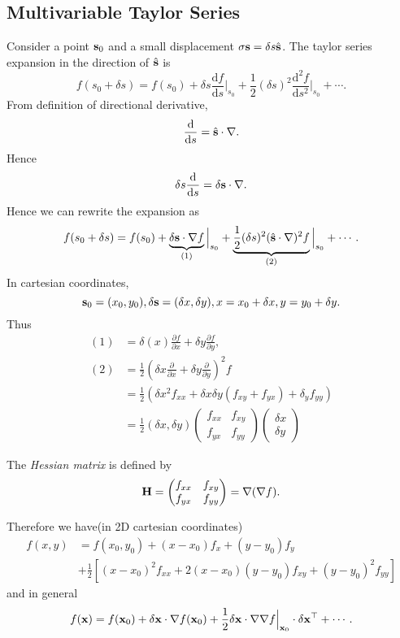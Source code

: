\documentclass[10pt]{article}
\begin{document}
    \subsection{Multivariable Taylor Series}
    Consider a point ${\bf s}_0$ and a small displacement $ \sigma{\bf s} = \delta s \hat{{\bf s}} $. The taylor series expansion in the direction of $\hat{{\bf s}}$ is 
    \[
        f(s_0+\delta s)=f(s_0)+\delta s \frac{\mathrm{d}f}{\mathrm{d}s}\Big|_{s_0}+\frac{1}{2}(\delta s)^2 \frac{\mathrm{d}^2f}{\mathrm{d}s^2}\Big|_{s_0}+\cdots  . 
    \]
    From definition of directional derivative, 
    \[
        \frac{\mathrm{d}}{\mathrm{d}s} = \hat{{\bf s}}\cdot \nabla. 
    \]
    Hence 
    \[
        \delta s \frac{\mathrm{d}}{\mathrm{d}s}=\delta{\bf s} \cdot \nabla . 
    \]
    Hence we can rewrite the expansion as 
    \[
        f(s_0+\delta s)=f(s_0)+\underbrace{\delta{\bf s} \cdot \nabla f}_{(1)}\Big|_{s_0}+\underbrace{\frac{1}{2}(\delta s)^2(\hat{{\bf s}}\cdot \nabla )^2 f}_{(2)}\Big|_{s_0}+\cdots .
    \]
    In cartesian coordinates,
    \[
        {\bf s}_0=(x_0,y_0), \delta{\bf s} = (\delta x,\delta y), x=x_0+\delta x, y=y_0+\delta y.
    \]
    Thus 
    \begin{align*}
        (1)&=\delta(x)\frac{\partial f}{\partial x}+\delta y \frac{\partial f}{\partial y}, \\
        (2)&= \frac{1}{2}\left( \delta x \frac{\partial }{\partial x}+\delta y \frac{\partial }{\partial y}   \right)^2 f\\
        &= \frac{1}{2}\left( \delta x^2 f_{xx}+\delta x\delta y (f_{xy}+f_{yx})+\delta_y f_{yy} \right)\\
        &= \frac{1}{2}(\delta x, \delta y) \begin{pmatrix}
            f_{xx}& f_{xy}\\
            f_{yx}& f_{yy}
        \end{pmatrix}
        \begin{pmatrix}
            \delta x\\ \delta y
        \end{pmatrix}
    \end{align*}
    \begin{definition}
        The \textit{Hessian matrix} is defined by 
        \[
            {\bf H} = \begin{pmatrix}
                f_{xx}& f_{xy}\\
            f_{yx}& f_{yy}
            \end{pmatrix} = \nabla (\nabla f).
        \]
    \end{definition}
    Therefore we have(in 2D cartesian coordinates)
    \begin{align*}
        f(x, y) &= f(x_0, y_0) + (x - x_0)f_x + (y - y_0)f_y \\
        &+ \frac{1}{2}[(x - x_0)^2 f_{xx} + 2(x - x_0)(y - y_0)f_{xy} + (y - y_0)^2 f_{yy}]
      \end{align*}
      and in general 
      \[
        f(\mathbf{x}) = f(\mathbf{x}_0 ) + \delta \mathbf{x}\cdot\nabla f(\mathbf{x}_0) + \frac{1}{2}\delta \mathbf{x}\cdot \nabla \nabla f\Big|_{{\bf x}_0}\cdot \delta \mathbf{x}^{\top}+ \cdots .
      \]
\end{document}
